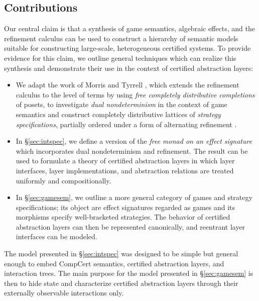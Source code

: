\documentclass[sigplan,screen]{acmart}
\begin{document}
\subsection{Contributions} %
\label{ssec:contrib}

Our central claim is that a synthesis
of %
game semantics, algebraic effects, and the refinement calculus
can be used to construct a hierarchy of semantic models
suitable for constructing large-scale, heterogeneous certified systems.
To provide evidence for this claim,
we outline general techniques
which can realize this synthesis
and demonstrate their use
in the context of certified abstraction layers:
\begin{itemize}
\item
  We adapt the work of Morris and Tyrrell \cite{augtyp,dndf},
  which extends the refinement calculus to the level of terms
  by using \emph{free completely distributive completions} of posets,
  to investigate \emph{dual nondeterminism}
  in the context of game semantics
  and construct
  completely distributive lattices of
  \emph{strategy specifications},
  partially ordered
  under a form of alternating refinement
  \cite{altref}.
\item
  In \S\ref{sec:intspec},
  we define a version of the
  \emph{free monad on an effect signature}
  which incorporates dual nondeterminism and refinement.
  The result can be used to formulate a theory of certified abstraction
  layers in which
  layer interfaces, layer implementations, and abstraction relations
  are treated uniformly and compositionally.
\item
  In \S\ref{sec:gamesem},
  we outline a more general category of games and
  strategy specifications;
  its object are effect signatures regarded as games
  and its morphisms specify well-bracketed strategies.
  The behavior of certified abstraction layers
  can then be represented canonically,
  and reentrant layer interfaces can be modeled.
\end{itemize}

The model presented in \S\ref{sec:intspec} was designed to be simple but
general enough to embed CompCert semantics, certified
abstraction layers, and interaction trees. The main purpose for
the model presented in \S\ref{sec:gamesem} is then to hide state and
characterize certified abstraction layers through
their externally observable interactions only.
\end{document}
